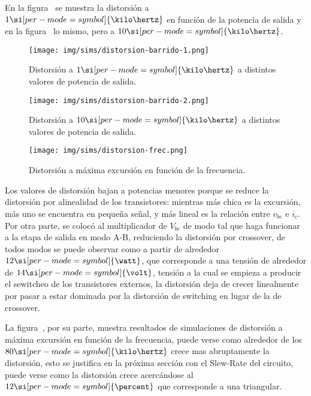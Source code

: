 En la figura~ se muestra la distorsión a $1 \si[per-mode=symbol]{\kilo\hertz}$ en función de la potencia de salida y en la figura~ lo mismo, pero a $10 \si[per-mode=symbol]{\kilo\hertz}$.

\clearpage


\begin{figure}[H]
	\centering
	\texttt{[image: img/sims/distorsion-barrido-1.png]}
	\caption{Distorsión a $1 \si[per-mode=symbol]{\kilo\hertz}$ a distintos valores de potencia de salida.}
	\label{fig:distorsion-barrido-1}
\end{figure}

\clearpage


\begin{figure}[H]
	\centering
	\texttt{[image: img/sims/distorsion-barrido-2.png]}
	\caption{Distorsión a $10 \si[per-mode=symbol]{\kilo\hertz}$ a distintos valores de potencia de salida.}
	\label{fig:distorsion-barrido-2}
\end{figure}

\clearpage

\begin{figure}[H]
	\centering
	\texttt{[image: img/sims/distorsion-frec.png]}
	\caption{Distorsión a máxima excursión en función de la frecuencia.}
	\label{fig:distorsion-frec}
\end{figure}

\clearpage



Los valores de distorsión bajan a potencias menores porque se reduce la distorsión por alinealidad de los transistores: mientras más chica es la excursión, más uno se encuentra en pequeña señal, y más lineal es la relación entre $v_{be}$ e $i_{c}$. Por otra parte, se colocó al multiplicador de $V_{be}$ de modo tal que haga funcionar a la etapa de salida en modo A-B, reduciendo la distorsión por crossover, de todos modos se puede observar como a partir de alrededor $12 \si[per-mode=symbol]{\watt}$, que corresponde a una tensión de alrededor de $14 \si[per-mode=symbol]{\volt}$, tensión a la cual se empieza a producir el sewitcheo de los transistores externos, la distorsión deja de crecer linealmente por pasar a estar dominada por la distorsión de switching en lugar de la de crossover.

La figura~, por su parte, muestra resultados de simulaciones de distorsión a máxima excursión en función de la frecuencia, puede verse como alrededor de los $80 \si[per-mode=symbol]{\kilo\hertz}$ crece mas abruptamente la distorsión, esto se justifica en la próxima sección con el Slew-Rate del circuito, puede verse como la distorsión crece acercándose al $12 \si[per-mode=symbol]{\percent}$ que corresponde a una triangular.



